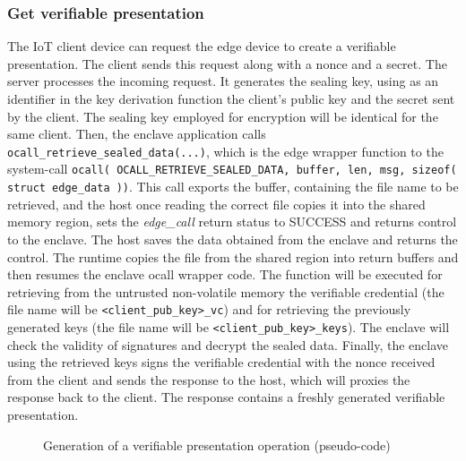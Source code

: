 \subsubsection{Get verifiable presentation}
The IoT client device can request the edge device to create a verifiable presentation.
The client sends this request along with a nonce and a secret. The server processes the incoming request. It generates the sealing key, using as an identifier in the key derivation function the client's public key and the secret sent by the client. The sealing key employed for encryption will be identical for the same client. 
Then, the enclave application calls \texttt{ocall\_retrieve\_sealed\_data(...)}, which is the edge wrapper function to the system-call \texttt{ocall( OCALL\_RETRIEVE\_SEALED\_DATA, buffer, len, msg, sizeof( struct edge\_data ))}. This call exports the buffer, containing the file name to be retrieved, and the host once reading the correct file copies it into the shared memory region, sets the \textit{edge\_call} return status to SUCCESS and returns control to the enclave. The host saves the data obtained from the enclave and returns the control. The runtime copies the file from the shared region into return buffers and then resumes the enclave ocall wrapper code.
The function will be executed for retrieving from the untrusted non-volatile memory the verifiable credential (the file name will be \texttt{<client\_pub\_key>\_vc}) and for retrieving the previously generated keys (the file name will be \texttt{<client\_pub\_key>\_keys}).
The enclave will check the validity of signatures and decrypt the sealed data.  
Finally, the enclave using the retrieved keys signs the verifiable credential with the nonce received from the client and sends the response to the host, which will proxies the response back to the client. The response contains a freshly generated verifiable presentation. \\

\begin{figure}[H]
    \centering
    
    \caption{Generation of a verifiable presentation operation (pseudo-code)}
    \label{poc-get-vp}
\end{figure}